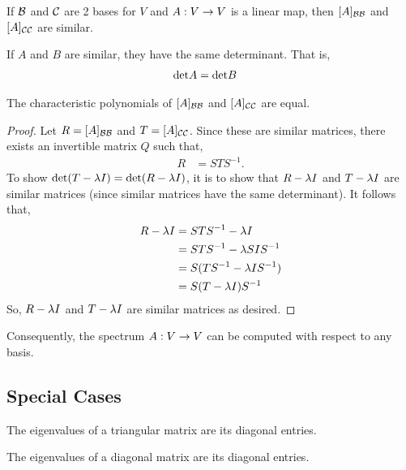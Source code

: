 \begin{lemma}
    If $\mathcal{B}$ and $\mathcal{C}$ are 2 bases for $V$ and $A : V \rightarrow V$ is a linear map, then $[A]_{\mathcal{B} \mathcal{B}}$ and $[A]_{\mathcal{C} \mathcal{C}}$ are similar.
\end{lemma}

\begin{lemma}
    If $A$ and $B$ are similar, they have the same determinant. That is,
    \begin{align*}
        \text{det} A &= \text{det} B
    \end{align*}
\end{lemma}

\begin{prop}
    The characteristic polynomials of $[A]_{\mathcal{B} \mathcal{B}}$ and $[A]_{\mathcal{C} \mathcal{C}}$ are equal.
\end{prop}
\begin{proof}
    Let $R = [A]_{\mathcal{B} \mathcal{B}}$ and $T = [A]_{\mathcal{C} \mathcal{C}}$. Since these are similar matrices, there exists an invertible matrix $Q$ such that,
    \begin{align*}
        R &= S T S^{-1}.
    \end{align*}
    To show $\text{det} (T - \lambda I) = \text{det} (R - \lambda I)$, it is to show that $R - \lambda I$ and $T - \lambda I$ are similar matrices (since similar matrices have
    the same determinant). It follows that,
    \begin{align*}
         R - \lambda I &= S T S^{-1} - \lambda I \\
         &= S T S ^{-1} - \lambda S I S^{-1} \\
         &= S (T S^{-1} - \lambda I S^{-1}) \\
         &= S (T - \lambda I) S^{-1}
    \end{align*}
    So, $R - \lambda I$ and $T - \lambda I$ are similar matrices as desired.
\end{proof}

\begin{remark}
    Consequently, the spectrum $A : V \rightarrow V$ can be computed with respect to any basis.
\end{remark}

\subsection{Special Cases}
\begin{lemma}
    The eigenvalues of a triangular matrix are its diagonal entries.
\end{lemma}

\begin{corollary}
    The eigenvalues of a diagonal matrix are its diagonal entries.
\end{corollary}


